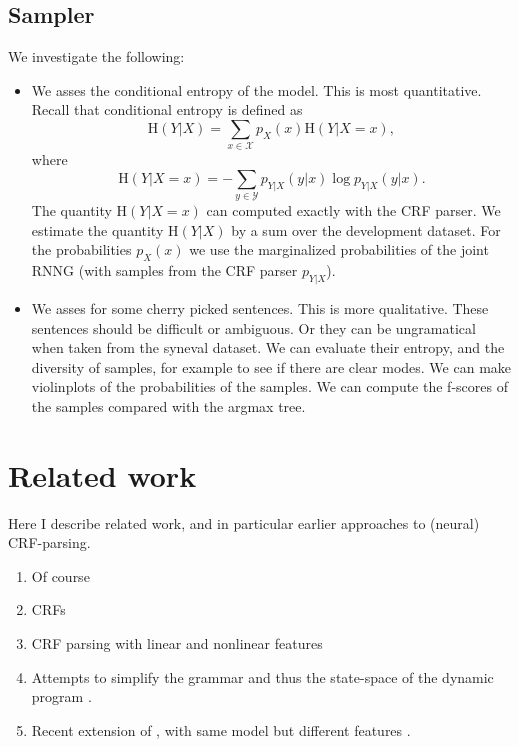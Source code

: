 \subsection{Sampler} We investigate the following:
  \begin{itemize}
    \item We asses the conditional entropy of the model. This is most quantitative. Recall that conditional entropy is defined as
    \begin{equation}
      \text{H}(Y|X) = \sum_{x \in \mathcal{X}} p_X(x)\text{H}(Y|X = x),
    \end{equation}
    where
    \begin{equation}
      \text{H}(Y|X = x) = - \sum_{y \in \mathcal{Y}} p_{Y|X}(y|x) \log p_{Y|X}(y|x).
    \end{equation}
    The quantity $\text{H}(Y|X = x)$ can computed exactly with the CRF parser. We estimate the quantity $\text{H}(Y|X)$ by a sum over the development dataset. For the probabilities $p_X(x)$ we use the marginalized probabilities of the joint RNNG (with samples from the CRF parser $p_{Y|X}$).
    \item We asses for some cherry picked sentences. This is more qualitative. These sentences should be difficult or ambiguous. Or they can be ungramatical when taken from the syneval dataset. We can evaluate their entropy, and the diversity of samples, for example to see if there are clear modes. We can make violinplots of the probabilities of the samples. We can compute the f-scores of the samples compared with the argmax tree.
  \end{itemize}

\section{Related work}
Here I describe related work, and in particular earlier approaches to (neural) CRF-parsing.
\begin{enumerate}
  \item Of course \citep{stern2017minimal}
  \item CRFs \citep{sutton2012crf}
  \item CRF parsing with linear and nonlinear features \citep{finkel2008crf,klein2015crf}
  \item Attempts to simplify the grammar and thus the state-space of the dynamic program \citep{hall2014less}.
  \item Recent extension of \citet{stern2017minimal}, with same model but different features \citep{kitaev2018attentive}.
\end{enumerate}

